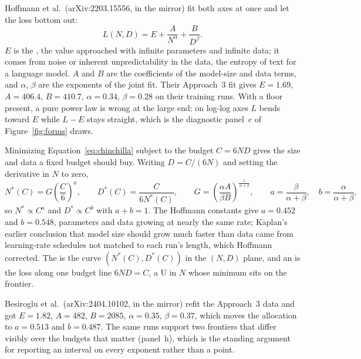 Hoffmann et al.\ (arXiv:2203.15556, in the mirror) fit both axes at once and let the loss bottom out:
\begin{equation}
  L(N, D) = E + \frac{A}{N^{\alpha}} + \frac{B}{D^{\beta}}.
  \label{eq:chinchilla}
\end{equation}
$E$ is the , the value approached with infinite parameters
and infinite data; it comes from noise or inherent unpredictability in the data,
the entropy of text for a language model. $A$ and $B$ are the coefficients of the
model-size and data terms, and $\alpha$, $\beta$ are the exponents of the joint fit.
Their Approach~3 fit gives $E = 1.69$, $A = 406.4$, $B = 410.7$, $\alpha = 0.34$,
$\beta = 0.28$ on their training runs. With a floor present, a pure power law is
wrong at the large end: on log-log axes $L$ bends toward $E$ while $L - E$ stays
straight, which is the diagnostic panel~c of Figure~\ref{fig:forms} draws.

Minimizing Equation~\ref{eq:chinchilla} subject to the budget $C = 6ND$ gives the
size and data a fixed budget should buy. Writing $D = C/(6N)$ and setting the
derivative in $N$ to zero,
\begin{equation}
  N^*(C) = G \left(\frac{C}{6}\right)^{a}, \qquad
  D^*(C) = \frac{C}{6 N^*(C)}, \qquad
  G = \left(\frac{\alpha A}{\beta B}\right)^{\frac{1}{\alpha + \beta}}, \qquad
  a = \frac{\beta}{\alpha + \beta}, \quad b = \frac{\alpha}{\alpha + \beta},
  \label{eq:optimum}
\end{equation}
so $N^* \propto C^{a}$ and $D^* \propto C^{b}$ with $a + b = 1$. The Hoffmann
constants give $a = 0.452$ and $b = 0.548$, parameters and data growing at nearly
the same rate; Kaplan's earlier conclusion that model size should grow much faster
than data came from learning-rate schedules not matched to each run's length, which
Hoffmann corrected. The  is the curve
$(N^*(C), D^*(C))$ in the $(N, D)$ plane, and an  is the loss
along one budget line $6ND = C$, a U in $N$ whose minimum sits on the frontier.

Besiroglu et al.\ (arXiv:2404.10102, in the mirror) refit the Approach~3 data and got $E = 1.82$, $A = 482$, $B = 2085$,
$\alpha = 0.35$, $\beta = 0.37$, which moves the allocation to $a = 0.513$ and
$b = 0.487$. The same runs support two frontiers that differ visibly over the
budgets that matter (panel~h), which is the standing argument for reporting an
interval on every exponent rather than a point.

